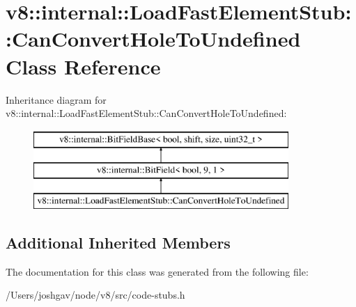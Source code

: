 \hypertarget{classv8_1_1internal_1_1_load_fast_element_stub_1_1_can_convert_hole_to_undefined}{}\section{v8\+:\+:internal\+:\+:Load\+Fast\+Element\+Stub\+:\+:Can\+Convert\+Hole\+To\+Undefined Class Reference}
\label{classv8_1_1internal_1_1_load_fast_element_stub_1_1_can_convert_hole_to_undefined}
Inheritance diagram for v8\+:\+:internal\+:\+:Load\+Fast\+Element\+Stub\+:\+:Can\+Convert\+Hole\+To\+Undefined\+:\begin{figure}[H]
\begin{center}
\leavevmode
\includegraphics[height=3.000000cm]{classv8_1_1internal_1_1_load_fast_element_stub_1_1_can_convert_hole_to_undefined}
\end{center}
\end{figure}
\subsection*{Additional Inherited Members}


The documentation for this class was generated from the following file\+:\begin{DoxyCompactItemize}
\item 
/\+Users/joshgav/node/v8/src/code-\/stubs.\+h\end{DoxyCompactItemize}

